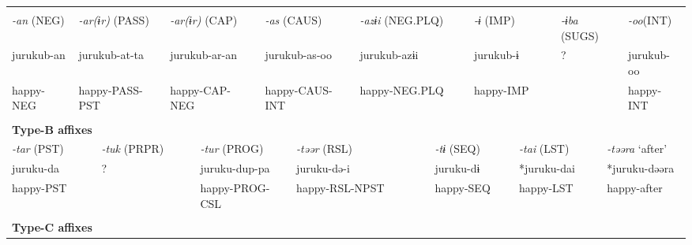 \tabletail{}
\tablelasttail{}
\begin{tabularx}{\textwidth}{XXXXXXXXXm{}XXXXXXXXX}
\lsptoprule
\multicolumn{19}{X}{{\bfseries Type-A affixes}}\\
\multicolumn{2}{X}{{ \textit{{}-an} (NEG)}} & \multicolumn{4}{X}{{ \textit{{}-ar(ɨr)} (PASS)}} & \multicolumn{3}{X}{{ \textit{{}-ar(ɨr)} (CAP)}} & \multicolumn{3}{X}{{ \textit{{}-as} (CAUS)}} & \multicolumn{2}{X}{{ \textit{{}-azɨi} (NEG.PLQ)}} & \multicolumn{2}{X}{{ \textit{{}-ɨ} (IMP)}} & \multicolumn{2}{X}{{ \textit{{}-ɨba} (SUGS)}} & { \textit{{}-oo}(INT)}\\
\multicolumn{2}{X}{{ jurukub-an}} & \multicolumn{4}{X}{{ jurukub-at-ta}} & \multicolumn{3}{X}{{ jurukub-ar-an}} & \multicolumn{3}{X}{{ jurukub-as-oo}} & \multicolumn{2}{X}{{ jurukub-azɨi}} & \multicolumn{2}{X}{{ jurukub-ɨ}} & \multicolumn{2}{X}{{ ?}} & { jurukub-oo}\\
\multicolumn{2}{X}{happy-NEG} & \multicolumn{4}{X}{happy-PASS-PST} & \multicolumn{3}{X}{happy-CAP-NEG} & \multicolumn{3}{X}{happy-CAUS-INT} & \multicolumn{2}{X}{happy-NEG.PLQ} & \multicolumn{2}{X}{happy-IMP} & \multicolumn{2}{X}{} & happy-INT\\
\multicolumn{19}{X}{}\\
\multicolumn{19}{X}{{\bfseries Type-B affixes}}\\
\multicolumn{3}{X}{{ \textit{{}-tar} (PST)}} & \multicolumn{4}{X}{{ \textit{{}-tuk} (PRPR)}} & \multicolumn{4}{X}{{ \textit{{}-tur} (PROG)}} & \multicolumn{2}{X}{{ \textit{{}-təər} (RSL)}} & \multicolumn{2}{X}{{ \textit{{}-tɨ} (SEQ)}} & \multicolumn{2}{X}{{ \textit{{}-tai} (LST)}} & \multicolumn{2}{X}{{ \textit{{}-təəra} ‘after’}}\\
\multicolumn{3}{X}{{ juruku-da}} & \multicolumn{4}{X}{{ ?}} & \multicolumn{4}{X}{{ juruku-dup-pa}} & \multicolumn{2}{X}{{ juruku-də-i}} & \multicolumn{2}{X}{{ juruku-dɨ}} & \multicolumn{2}{X}{{ *juruku-dai}} & \multicolumn{2}{X}{{ *juruku-dəəra}}\\
\multicolumn{3}{X}{happy-PST} & \multicolumn{4}{X}{} & \multicolumn{4}{X}{happy-PROG-CSL} & \multicolumn{2}{X}{happy-RSL-NPST} & \multicolumn{2}{X}{happy-SEQ} & \multicolumn{2}{X}{happy-LST} & \multicolumn{2}{X}{{ happy-after}}\\
\multicolumn{3}{X}{} & \multicolumn{4}{X}{} & \multicolumn{4}{X}{} & \multicolumn{2}{X}{} & \multicolumn{2}{X}{} & \multicolumn{2}{X}{} & \multicolumn{2}{X}{}\\
\multicolumn{19}{X}{{\bfseries Type-C affixes}}\\

\end{tabularx}
